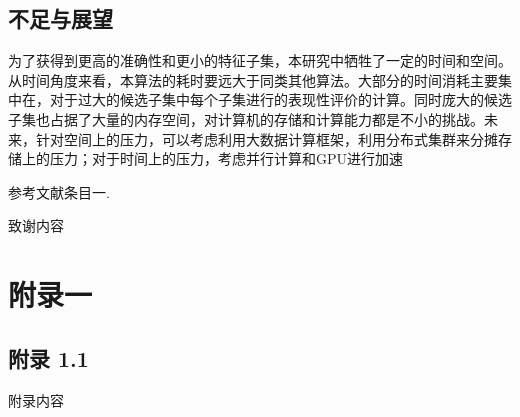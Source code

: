 \documentclass{njubachelor}
\begin{document}
\subsection{不足与展望}
  为了获得到更高的准确性和更小的特征子集，本研究中牺牲了一定的时间和空间。从时间角度来看，本算法的耗时要远大于同类其他算法。大部分的时间消耗主要集中在，对于过大的候选子集中每个子集进行的表现性评价的计算。同时庞大的候选子集也占据了大量的内存空间，对计算机的存储和计算能力都是不小的挑战。未来，针对空间上的压力，可以考虑利用大数据计算框架，利用分布式集群来分摊存储上的压力；对于时间上的压力，考虑并行计算和GPU进行加速


\newpage
{}

\begin{thebibliography}{99}
 参考文献条目一.
\end{thebibliography}

\newpage
\ack

致谢内容

\newpage
\appendix

\section{附录一}

\subsection{附录 1.1}

附录内容
\end{document}
